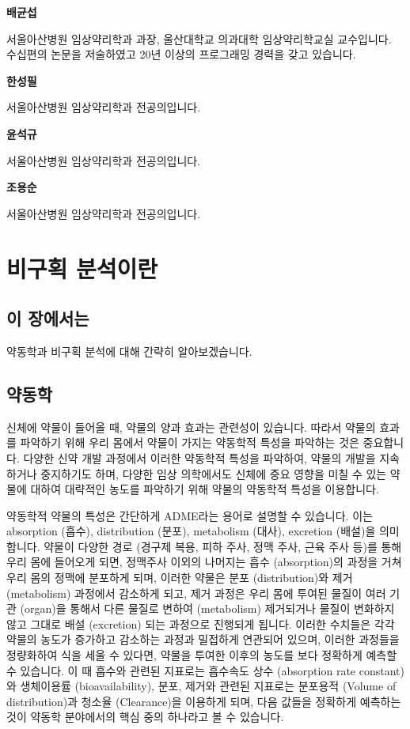 \documentclass[12pt,]{krantz}
\theoremstyle{definition}
\theoremstyle{definition}
\theoremstyle{definition}
\theoremstyle{remark}
\begin{document}
\textbf{배균섭}

서울아산병원 임상약리학과 과장, 울산대학교 의과대학 임상약리학교실
교수입니다. 수십편의 논문을 저술하였고 20년 이상의 프로그래밍 경력을
갖고 있습니다.

\textbf{한성필}

서울아산병원 임상약리학과 전공의입니다.

\textbf{윤석규}

서울아산병원 임상약리학과 전공의입니다.

\textbf{조용순}

서울아산병원 임상약리학과 전공의입니다.

\mainmatter

\chapter{비구획 분석이란}\label{introduction}

\section{이 장에서는}\label{summary-introduction}

약동학과 비구획 분석에 대해 간략히 알아보겠습니다.

\section{약동학}\label{PK-introduction}

신체에 약물이 들어올 때, 약물의 양과 효과는 관련성이 있습니다. 따라서
약물의 효과를 파악하기 위해 우리 몸에서 약물이 가지는 약동학적 특성을
파악하는 것은 중요합니다. 다양한 신약 개발 과정에서 이러한 약동학적
특성을 파악하여, 약물의 개발을 지속하거나 중지하기도 하며, 다양한 임상
의학에서도 신체에 중요 영향을 미칠 수 있는 약물에 대하여 대략적인 농도를
파악하기 위해 약물의 약동학적 특성을 이용합니다.

약동학적 약물의 특성은 간단하게 ADME라는 용어로 설명할 수 있습니다. 이는
absorption (흡수), distribution (분포), metabolism (대사), excretion
(배설)을 의미합니다. 약물이 다양한 경로 (경구제 복용, 피하 주사, 정맥
주사, 근육 주사 등)를 통해 우리 몸에 들어오게 되면, 정맥주사 이외의
나머지는 흡수 (absorption)의 과정을 거쳐 우리 몸의 정맥에 분포하게 되며,
이러한 약물은 분포 (distribution)와 제거 (metabolism) 과정에서 감소하게
되고, 제거 과정은 우리 몸에 투여된 물질이 여러 기관 (organ)을 통해서
다른 물질로 변하여 (metabolism) 제거되거나 물질이 변화하지 않고 그대로
배설 (excretion) 되는 과정으로 진행되게 됩니다. 이러한 수치들은 각각
약물의 농도가 증가하고 감소하는 과정과 밀접하게 연관되어 있으며, 이러한
과정들을 정량화하여 식을 세울 수 있다면, 약물을 투여한 이후의 농도를
보다 정확하게 예측할 수 있습니다. 이 때 흡수와 관련된 지표로는 흡수속도
상수 (absorption rate constant)와 생체이용률 (bioavailability), 분포,
제거와 관련된 지표로는 분포용적 (Volume of distribution)과 청소율
(Clearance)을 이용하게 되며, 다음 값들을 정확하게 예측하는 것이 약동학
분야에서의 핵심 중의 하나라고 볼 수 있습니다.
\end{document}
